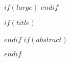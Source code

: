 $if(large)$
\large
$endif$

$if(title)$
\maketitle
$endif$
$if(abstract)$
\begin{abstract}
$abstract$
\end{abstract}
$endif$



